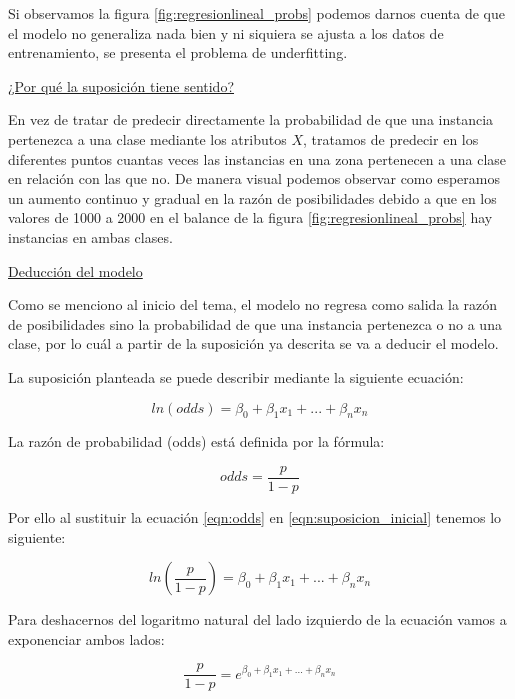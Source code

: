 \documentclass[11pt,fleqn]{book} %
\begin{document}
Si observamos la figura \ref{fig:regresionlineal_probs} podemos darnos cuenta de que el modelo no generaliza nada bien y ni siquiera se ajusta a los datos de entrenamiento, se presenta el problema de underfitting.

\underline{¿Por qué la suposición tiene sentido?}

En vez de tratar de predecir directamente la probabilidad de que una instancia pertenezca a una clase mediante los atributos $X$, tratamos de predecir en los diferentes puntos cuantas veces las instancias en una zona pertenecen a una clase en relación con las que no. De manera visual podemos observar como esperamos un aumento continuo y gradual en la razón de posibilidades debido a que en los valores de 1000 a 2000 en el balance de la figura \ref{fig:regresionlineal_probs} hay instancias en ambas clases.

\underline{Deducción del modelo}

Como se menciono al inicio del tema, el modelo no regresa como salida la razón de posibilidades sino la probabilidad de que una instancia pertenezca o no a una clase, por lo cuál a partir de la suposición ya descrita se va a deducir el modelo.

La suposición planteada se puede describir mediante la siguiente ecuación:

\begin{equation}
ln (odds) = \beta_0 + \beta_1 x_1 + ... + \beta_n x_n
\label{eqn:suposicion_inicial} 
\end{equation}

La razón de probabilidad (odds) está definida por la fórmula:


\begin{equation}
odds = \frac{p}{1-p}
\label{eqn:odds} 
\end{equation}

Por ello al sustituir la ecuación \ref{eqn:odds} en \ref{eqn:suposicion_inicial} tenemos lo siguiente:

\begin{equation}
ln ( \frac{p}{1-p}) = \beta_0 + \beta_1 x_1 + ... + \beta_n x_n
\label{eqn:suposicion_inicial_mod} 
\end{equation}

Para deshacernos del logaritmo natural del lado izquierdo de la ecuación vamos a exponenciar ambos lados:

\begin{equation}
\frac{p}{1-p} = e^{\beta_0 + \beta_1 x_1 + ... + \beta_n x_n}
\label{eqn:suposicion_inicial_mod2} 
\end{equation}
\end{document}
